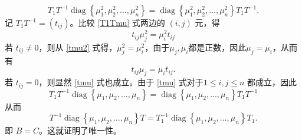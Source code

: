 \begin{enumerate}[1~]
\begin{solution}
\begin{equation}
T _ { 1 } T ^ { - 1 } \operatorname { diag } \left\{ \mu _ { 1 } ^ { 2 } , \mu _ { 2 } ^ { 2 } , \dots , \mu _ { n } ^ { 2 } \right\} = \operatorname { diag } \left\{ \mu _ { 1 } ^ { 2 } , \mu _ { 2 } ^ { 2 } , \dots , \mu _ { n } ^ { 2 } \right\} T _ { 1 } T ^ { - 1 }.
\end{equation}
记 $T _ { 1 } T ^ { - 1 } = \left( t _ { i j } \right)$。比较 \eqref{T1Tmu} 式两边的 $(i, j)$ 元，得
\begin{equation}\label{tmu2}
t _ { i j } \mu _ { j } ^ { 2 } = \mu _ { i } ^ { 2 } t _ { i j }
\end{equation}
若 $t_{ij}\ne0$，则从 \eqref{tmu2} 式得，$\mu_j^2=\mu_i^2$，由于$\mu_j, \mu_i$都是正数，因此$\mu_j=\mu_i$，从而有\begin{equation}\label{tmu}
t_{ij}\mu_j=\mu_i t_{ij}.
\end{equation}
若 $t_{ij}=0$，则显然 \eqref{tmu} 式也成立。由于 \eqref{tmu} 式对于$1\le i, j\le n$ 都成立，因此
\begin{equation}\label{T1Tmu}
T _ { 1 } T ^ { - 1 } \operatorname { diag } \left\{ \mu _ { 1 } , \mu _ { 2 } , \dots , \mu _ { n } \right\} = \operatorname { diag } \left\{ \mu _ { 1 } , \mu _ { 2 } , \dots , \mu _ { n } \right\} T _ { 1 } T ^ { - 1 }
\end{equation}
从而
\[
T ^ { - 1 } \operatorname {diag} \left\{ \mu _ { 1 } , \mu _ { 2 } , \dots , \mu _ { n } \right\} T = T _ { 1 } ^ { - 1 } \operatorname {diag} \left\{ \mu _ { 1 } , \mu _ { 2 } , \dots , \mu _ { n } \right\} T _ { 1 }.
\]
即 $B=C$。这就证明了唯一性。
\end{solution}


\end{enumerate}
